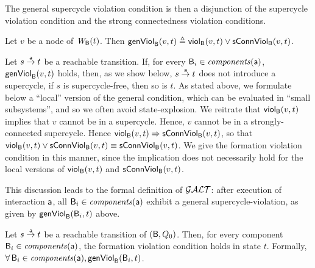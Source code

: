 The general supercycle violation condition is then a disjunction of the supercycle violation condition
and the strong connectedness violation conditions.


\begin{definition}
\label{def:formation.violation} 
\label{defn:formation.violation} 
Let $v$ be a node of $\wfg{\B}{t}$.
Then 
$\genViol{v}{t}  \df \scV{v}{t}  \lor \connViol{v}{t}$.
\end{definition}
%
Let $s \goesto[\act] t$ be a reachable transition. If, for every $\B_i \in \cmps{\act}$, $\formViol{v}{t}$ holds, then, as we show below,
$s \goesto[\act] t$ does not introduce a supercycle, \ie if $s$ is supercycle-free, then so is $t$. As stated above, we formulate below a ``local''
version of the general condition, which can be evaluated in ``small subsystems'', and so we often avoid state-explosion.
%
%
We reitrate that $\scV{v}{t}$ implies that $v$ cannot be in a supercycle. Hence, $v$ cannot be in a strongly-connected supercycle.
Hence $\scV{v}{t} \imp \connViol{v}{t}$, so that 
$\scV{v}{t}  \lor \connViol{v}{t} \ev  \connViol{v}{t}$.
We give the formation violation condition in this manner, since 
the implication does not necessarily hold for the local versions of $\scV{v}{t}$ and $\connViol{v}{t}$.

This discussion leads to the formal definition of $\GAO$: 
after execution of interaction $\act$, all $\B_i \in \cmps{\act}$ exhibit a general supercycle-violation, as given by $\genViol{\B_i}{t}$ above.

\begin{definition} \label{def:global.ANDOR-cond} \label{defn:global.ANDOR-cond} 
Let $s \goesto[\act] t$ be a reachable transition of $(\B, Q_0)$.
Then, for every component $\B_i \in \comps{\act}$, the formation violation condition holds in state $t$.
Formally,\\
\ind  $\fas \B_i \in \comps{\act}, \genViol{\B_i}{t}$.
\end{definition}


